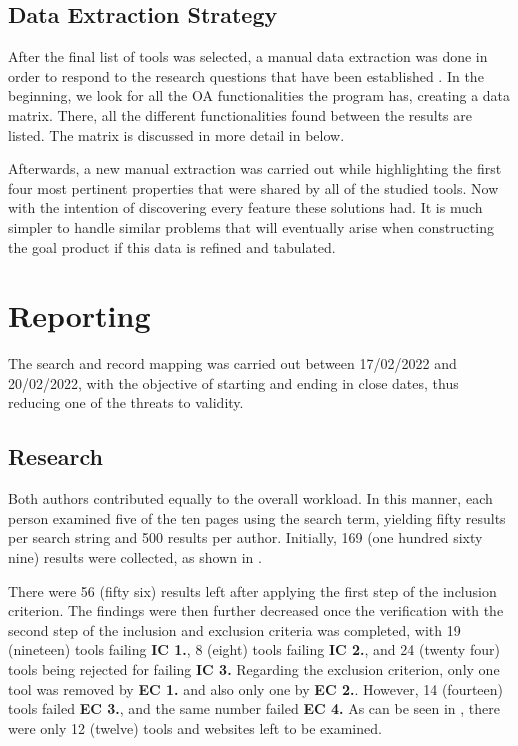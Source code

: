 

\subsection{Data Extraction Strategy}\label{sec:gl-planning-datastrategy}

After the final list of tools was selected, a manual data extraction was done in order to respond to the research questions that have been established . In the beginning, we look for all the \ac{OA} functionalities the program has, creating a data matrix. There, all the different functionalities found between the results are listed. The matrix is discussed in more detail in  below.

Afterwards, a new manual extraction was carried out while highlighting the first four most pertinent properties that were shared by all of the studied tools. Now with the intention of discovering every feature these solutions had. It is much simpler to handle similar problems that will eventually arise when constructing the goal product if this data is refined and tabulated.

\section{Reporting}\label{sec:gl-reporting}

The search and record mapping was carried out between 17/02/2022 and 20/02/2022, with the objective of starting and ending in close dates, thus reducing one of the threats to validity.

\subsection{Research}\label{sec:gl-research}

Both authors contributed equally to the overall workload. In this manner, each person examined five of the ten pages using the search term, yielding fifty results per search string and 500 results per author. Initially, 169 (one hundred sixty nine) results were collected, as shown in .

There were 56 (fifty six) results left after applying the first step of the inclusion criterion. The findings were then further decreased once the verification with the second step of the inclusion and exclusion criteria was completed, with 19 (nineteen) tools failing \textbf{IC 1.}, 8 (eight) tools failing \textbf{IC 2.}, and 24 (twenty four) tools being rejected for failing \textbf{IC 3.} Regarding the exclusion criterion, only one tool was removed by \textbf{EC 1.} and also only one by \textbf{EC 2.}. However, 14 (fourteen) tools failed \textbf{EC 3.}, and the same number failed \textbf{EC 4.} As can be seen in , there were only 12 (twelve) tools and websites left to be examined.


